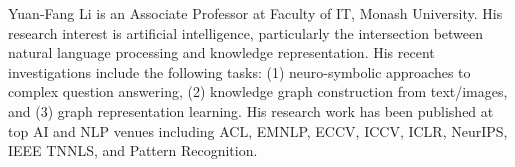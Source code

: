 \documentclass[10pt,journal,compsoc]{IEEEtran}
\begin{document}
\begin{IEEEbiography}{Yuan-Fang Li}
is an Associate Professor at Faculty of IT, Monash University. His research interest is artificial intelligence, particularly the intersection between natural language processing and knowledge representation. His recent investigations include the following tasks: (1) neuro-symbolic approaches to complex question answering, (2) knowledge graph construction from text/images, and (3) graph representation learning. His research work has been published at top AI and NLP venues including ACL, EMNLP, ECCV, ICCV, ICLR, NeurIPS, IEEE TNNLS, and Pattern Recognition. 
\end{IEEEbiography}
\end{document}
